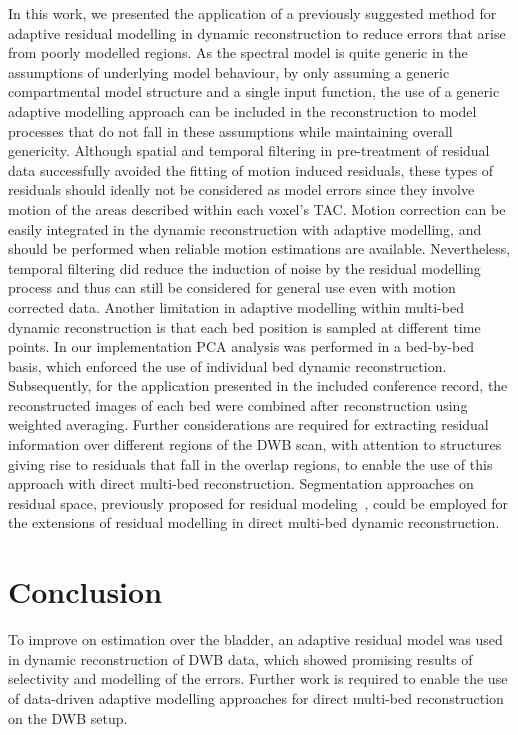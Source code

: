 In this work, we presented the application of a previously suggested method for adaptive residual modelling in dynamic reconstruction to reduce errors that arise from poorly modelled regions. As the spectral model is quite generic in the assumptions of underlying model behaviour, by only assuming a generic compartmental model structure and a single input function, the use of a generic adaptive modelling approach can be included in the reconstruction to model processes that do not fall in these assumptions while maintaining overall genericity. 
Although spatial and temporal filtering in pre-treatment of residual data successfully avoided the fitting of motion induced residuals, these types of residuals should ideally not be considered as model errors since they involve motion of the areas described within each voxel's TAC. Motion correction can be easily integrated in the dynamic reconstruction with adaptive modelling, and should be performed when reliable motion estimations are available. Nevertheless, temporal filtering did reduce the induction of noise by the residual modelling process and thus can still be considered for general use even with motion corrected data.
Another limitation in adaptive modelling within multi-bed dynamic reconstruction is that each bed position is sampled at different time points. In our implementation PCA analysis was performed in a bed-by-bed basis, which enforced the use of individual bed dynamic reconstruction. Subsequently, for the application presented in the included conference record, the reconstructed images of each bed were combined after reconstruction using weighted averaging. Further considerations are required for extracting residual information over different regions of the DWB scan, with attention to structures giving rise to residuals that fall in the overlap regions, to enable the use of this approach with direct multi-bed reconstruction. Segmentation approaches on residual space, previously proposed for residual modeling~\cite{Germino2016}, could be employed for the extensions of residual modelling in direct multi-bed dynamic reconstruction.

\section{Conclusion}
To improve on estimation over the bladder, an adaptive residual model was used in dynamic reconstruction of DWB data, which showed promising results of selectivity and modelling of the errors. Further work is required to enable the use of data-driven adaptive modelling approaches for direct multi-bed reconstruction on the DWB setup. 

